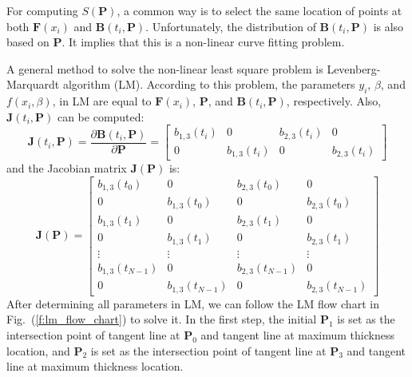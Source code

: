 For computing $S(\mathbf{P})$, a common way is to select the same location of points at both $\mathbf{F}(x_i)$ and
$\mathbf{B}(t_i, \mathbf{P})$. Unfortunately, the distribution of $\mathbf{B}(t_i, \mathbf{P})$ is also based on
$\mathbf{P}$. It implies that this is a non-linear curve fitting problem.

A general method to solve the non-linear least square problem is Levenberg-Marquardt algorithm (LM). According to this
problem, the parameters $y_i$, $\beta$, and $f(x_i, \beta)$, in LM are equal to $\mathbf{F}(x_i)$, $\mathbf{P}$, and
$\mathbf{B}(t_i, \mathbf{P})$, respectively. Also, $\mathbf{J}(t_i, \mathbf{P})$ can be computed:
\begin{equation*}
    \mathbf{J}(t_i, \mathbf{P}) = \frac{\partial \mathbf{B}(t_i, \mathbf{P})}{\partial \mathbf{P}} =
    \begin{bmatrix}
        b_{1,3}(t_i) & 0 & b_{2,3}(t_i) & 0 \\
        0 & b_{1,3}(t_i) & 0 & b_{2,3}(t_i)
    \end{bmatrix}
\end{equation*}
and the Jacobian matrix $\mathbf{J}(\mathbf{P})$ is:
\begin{equation*}
    \mathbf{J}(\mathbf{P}) =
    \begin{bmatrix}
        b_{1,3}(t_0) & 0 & b_{2,3}(t_0) & 0 \\
        0 & b_{1,3}(t_0) & 0 & b_{2,3}(t_0) \\
        b_{1,3}(t_1) & 0 & b_{2,3}(t_1) & 0 \\
        0 & b_{1,3}(t_1) & 0 & b_{2,3}(t_1) \\
        \vdots & \vdots & \vdots & \vdots \\
        b_{1,3}(t_{N-1}) & 0 & b_{2,3}(t_{N-1}) & 0 \\
        0 & b_{1,3}(t_{N-1}) & 0 & b_{2,3}(t_{N-1})
    \end{bmatrix}
\end{equation*}
After determining all parameters in LM, we can follow the LM flow chart in Fig.~(\ref{f:lm_flow_chart}) to solve it.
In the first step, the initial $\mathbf{P}_1$ is set as the intersection point of tangent line at $\mathbf{P}_0$ and
tangent line at maximum thickness location, and $\mathbf{P}_2$ is set as the intersection point of tangent line at
$\mathbf{P}_3$ and tangent line at maximum thickness location.

